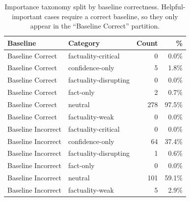 \begin{table}[h]
\centering\small
\begin{tabular}{llrr}
\toprule
Baseline & Category & Count & \% \\
\midrule
  Baseline Correct & factuality-critical & 0 & 0.0\% \\
  Baseline Correct & confidence-only & 5 & 1.8\% \\
  Baseline Correct & factuality-disrupting & 0 & 0.0\% \\
  Baseline Correct & fact-only & 2 & 0.7\% \\
  Baseline Correct & neutral & 278 & 97.5\% \\
  Baseline Correct & factuality-weak & 0 & 0.0\% \\
  Baseline Incorrect & factuality-critical & 0 & 0.0\% \\
  Baseline Incorrect & confidence-only & 64 & 37.4\% \\
  Baseline Incorrect & factuality-disrupting & 1 & 0.6\% \\
  Baseline Incorrect & fact-only & 0 & 0.0\% \\
  Baseline Incorrect & neutral & 101 & 59.1\% \\
  Baseline Incorrect & factuality-weak & 5 & 2.9\% \\
\bottomrule
\end{tabular}
\caption{Importance taxonomy split by baseline correctness. Helpful-important cases require a correct baseline, so they only appear in the ``Baseline Correct'' partition.}
\label{tab:e2_taxonomy_by_baseline}
\end{table}
